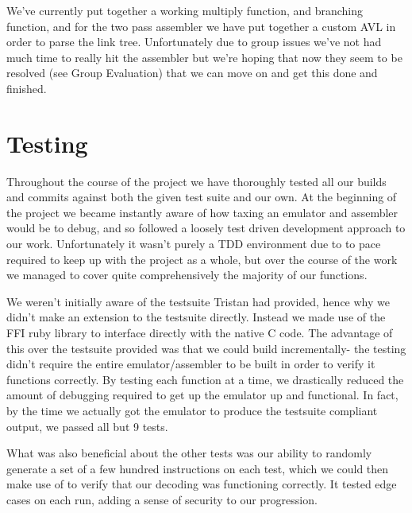 \documentclass[11pt]{article}
\begin{document}
We've currently put together a working multiply function, and branching function, and for the two pass assembler we have put together a custom AVL in order to parse the link tree. Unfortunately due to group issues we've not had much time to really hit the assembler but we're hoping that now they seem to be resolved (see Group Evaluation) that we can move on and get this done and finished.

\section{Testing}

Throughout the course of the project we have thoroughly tested all our builds and commits against both the given test suite and our own. At the beginning of the project we became instantly aware of how taxing an emulator and assembler would be to debug, and so followed a loosely test driven development approach to our work. Unfortunately it wasn't purely a TDD environment due to to pace required to keep up with the project as a whole, but over the course of the work we managed to cover quite comprehensively the majority of our functions.

We weren't initially aware of the testsuite Tristan had provided, hence why we didn't make an extension to the testsuite directly. Instead we made use of the FFI ruby library to interface directly with the native C code. The advantage of this over the testsuite provided was that we could build incrementally- the testing didn't require the entire emulator/assembler to be built in order to verify it functions correctly. By testing each function at a time, we drastically reduced the amount of debugging required to get up the emulator up and functional. In fact, by the time we actually got the emulator to produce the testsuite compliant output, we passed all but 9 tests.

What was also beneficial about the other tests was our ability to randomly generate a set of a few hundred instructions on each test, which we could then make use of to verify that our decoding was functioning correctly. It tested edge cases on each run, adding a sense of security to our progression.
\end{document}
